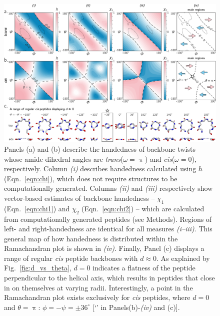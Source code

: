\documentclass[fleqn,10pt,lineno]{wlpeerj} %
\newcommand{\n}[1]{{\color{black}#1}} %
\newcommand{\Fig}[1]{Fig.~\ref{#1}}
\newcommand{\Eqn}[1]{Eqn.~\ref{#1}}
\newcommand{\h}{h}
\newcommand{\cis}{{\em cis}\xspace}
\newcommand{\trans}{{\em trans}\xspace}
\begin{document}
{\begin{figure}[t!]
\begin{adjustwidth}{-1in}{0in} %
\centering
\includegraphics[width=0.8\linewidth]{./figures/various_chis.pdf}
\caption{\label{fig:chi_all} 
Panels (a) and (b) describe the handedness of backbone twists whose amide dihedral angles are \trans ($\omega=\uppi$) and \cis ($\omega=0$), respectively. Column \textit{(i)} describes handedness calculated using $\h$ (\Eqn{eqn:chi}), which does not require structures to be computationally generated. Columns \textit{(ii)} and \textit{(iii)} respectively show vector-based estimates of backbone handedness -- $\chi_1$ (\Eqn{eqn:chi1}) and $\chi_2$ (\Eqn{eqn:chi2}) -- which are calculated from computationally generated peptides (see Methods). Regions of left- and right-handedness are identical for all measures \textit{(i--iii)}. This general map of how handedness is distributed within the Ramachandran plot is shown in \textit{(iv)}.  \n{Finally, Panel (c) displays a range of regular \cis peptide backbones with $d\approx0$. As explained by \Fig{fig:d_vs_theta}, $d=0$ indicates a flatness of the peptide perpendicular to the helical axis, which results in peptides that close in on themselves at varying radii. Interestingly, a point in the Ramachandran plot exists exclusively for \cis peptides, where $d=0$ and $\theta=\uppi$: $\phi=-\psi=\pm 36^\circ$ [`\FiveStarOpen' in Panels(b)-\textit{(iv)} and (c)].} }
\end{adjustwidth}
\end{figure}

}
\end{document}
